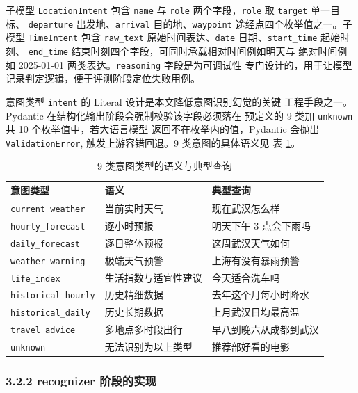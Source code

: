 \documentclass[a4paper]{article}
\newcommand{\song}{\CJKfamily{song}}
\theoremstyle{definition}
\theoremstyle{plain}
\theoremstyle{remark}
\newcommand{\reftab}[1]{表 \ref{#1}}
\newcommand{\bk}{\discretionary{}{}{}}
\begin{document}
子模型 \texttt{LocationIntent} 包含 \texttt{name} 与
\texttt{role} 两个字段，\texttt{role} 取 \texttt{target} 单一目标、
\texttt{departure} 出发地、\texttt{arrival} 目的地、\texttt{waypoint}
途经点四个枚举值之一。子模型 \texttt{TimeIntent} 包含 \texttt{raw\_\bk{}text}
原始时间表达、\texttt{date} 日期、\texttt{start\_\bk{}time} 起始时刻、
\texttt{end\_\bk{}time} 结束时刻四个字段，可同时承载相对时间例如明天与
绝对时间例如 2025-01-01 两类表达。\texttt{reasoning} 字段是为可调试性
专门设计的，用于让模型记录判定逻辑，便于评测阶段定位失败用例。

意图类型 \texttt{intent} 的 Literal 设计是本文降低意图识别幻觉的关键
工程手段之一。Pydantic 在结构化输出阶段会强制校验该字段必须落在
预定义的 9 类加 \texttt{unknown} 共 10 个枚举值中，若大语言模型
返回不在枚举内的值，Pydantic 会抛出 \texttt{ValidationError},
触发上游容错回退。9 类意图的具体语义见 \reftab{tab:intent-types}。

\begin{table}[!ht]
    \centering
    \caption{9 类意图类型的语义与典型查询}
    \label{tab:intent-types}
    \song\fontsize{9pt}{12pt}\selectfont
    \renewcommand{\arraystretch}{0.95}
    \begin{tabular}{lll}
        \toprule
        意图类型 & 语义 & 典型查询 \\
        \midrule
        \texttt{current\_\bk{}weather} & 当前实时天气 & 现在武汉怎么样 \\
        \texttt{hourly\_\bk{}forecast} & 逐小时预报 & 明天下午 3 点会下雨吗 \\
        \texttt{daily\_\bk{}forecast} & 逐日整体预报 & 这周武汉天气如何 \\
        \texttt{weather\_\bk{}warning} & 极端天气预警 & 上海有没有暴雨预警 \\
        \texttt{life\_\bk{}index} & 生活指数与适宜性建议 & 今天适合洗车吗 \\
        \texttt{historical\_\bk{}hourly} & 历史精细数据 & 去年这个月每小时降水 \\
        \texttt{historical\_\bk{}daily} & 历史长期数据 & 上月武汉日均最高温 \\
        \texttt{travel\_\bk{}advice} & 多地点多时段出行 & 早八到晚六从成都到武汉 \\
        \texttt{unknown} & 无法识别为以上类型 & 推荐部好看的电影 \\
        \bottomrule
    \end{tabular}
\end{table}

\subsubsection*{3.2.2 \quad recognizer 阶段的实现}
\end{document}
